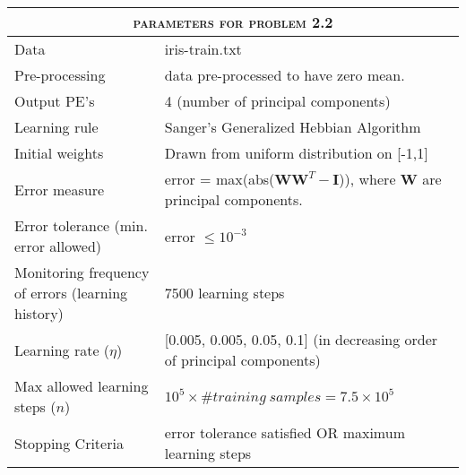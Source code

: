 \documentclass[epsfig]{article}
\def\spar{\vskip10pt}
\begin{document}
{
\begin{tabular}{ll}
\hline
\multicolumn{2}{c}{\textsc{  parameters for problem 2.2}} \\
\hline
\hline
Data				& iris-train.txt \\
\hline
Pre-processing          &  data  pre-processed to have zero mean. \\
\hline
Output PE's			& 4 (number of principal components) \\
\hline
Learning rule                     & Sanger's Generalized Hebbian Algorithm\\
\hline
Initial weights                    & Drawn from uniform distribution on [-1,1] \\
\hline
Error measure                   &  error = max(abs($\mathbf{WW}^T-\mathbf{I}$)), where $\mathbf{W}$ are principal components.\\
\hline
Error tolerance (min. error allowed)                  & error $\leq 10^{-3}$\\ 
\hline
Monitoring frequency of errors  (learning history) & 7500 learning steps\\
\hline
Learning rate ($\eta$)            & [0.005, 0.005, 0.05, 0.1] (in decreasing order of principal components)\\
\hline
Max allowed learning steps ($n$)   & $10^5 \times \# training~samples = 7.5 \times 10^5$ \\
\hline
Stopping Criteria          & error tolerance satisfied OR maximum learning steps \\
\hline
\end{tabular}
}
\spar
\end{document}
